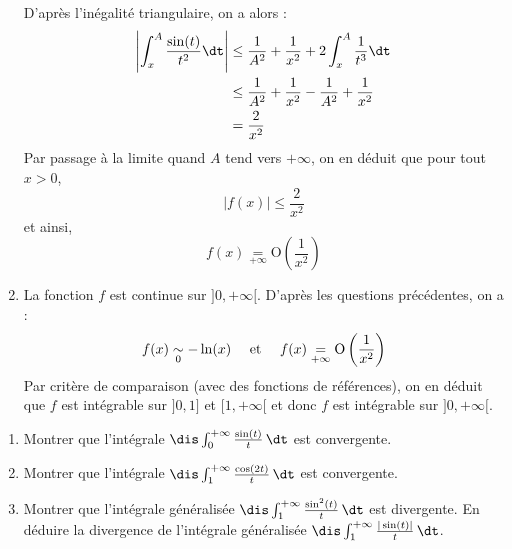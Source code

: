\documentclass[a4paper,10pt]{report}
\begin{document}
\begin{enumerate}
\begin{align*}
  \end{align*}
 D'après l'inégalité triangulaire, on a alors :
 \begin{align*}
 \left\vert  \int_{x}^A \dfrac{\sin(t)}{t^2} \dt \right\vert & \leq \dfrac{1}{A^2} + \dfrac{1}{x^2} + 2 \int_{x}^A \dfrac{1}{t^3} \dt  \\
 & \leq \dfrac{1}{A^2} + \dfrac{1}{x^2} - \dfrac{1}{A^2} + \dfrac{1}{x^2}  \\
 & = \dfrac{2}{x^2}
 \end{align*}
 Par passage à la limite quand $A$ tend vers $+ \infty$, on en déduit que pour tout $x>0$,
 $$ \vert f(x) \vert \leq \dfrac{2}{x^2}$$
 et ainsi,
$$f(x) \underset{+ \infty}{=} \textrm{O} \left( \dfrac{1}{x^2} \right) $$
\item La fonction $f$ est continue sur $]0, + \infty[$. D'après les questions précédentes, on a :
$$ f(x) \underset{0}{\sim} -\ln(x) \quad \hbox{ et } \quad f(x) \underset{+ \infty}{=} \textrm{O} \left( \dfrac{1}{x^2} \right)$$
Par critère de comparaison (avec des fonctions de références), on en déduit que $f$ est intégrable sur $]0,1]$ et $[1, + \infty[$ et donc $f$ est intégrable sur $]0, + \infty[$.
\end{enumerate}

\begin{Exercice}{} \begin{enumerate}
\item Montrer que l'int\'egrale $\dis \int_0^{+ \infty} \frac{\sin(t)}{t}\, \dt$ est convergente.
\item Montrer que l'int\'egrale $\dis \int_1^{+\infty}\frac{\cos(2t)}{t}\, \dt$ est convergente.
\item Montrer que l'int\'egrale g\'en\'eralis\'ee $\dis \int_1^{+\infty}\frac{\sin^2(t)}{t} \, \dt$ est divergente. En d\'eduire la divergence de l'int\'egrale g\'en\'eralis\'ee $\dis \int_1^{+\infty}\frac{|\sin(t)|}{t} \, \dt$.
\end{enumerate}
\end{Exercice}
\end{document}
